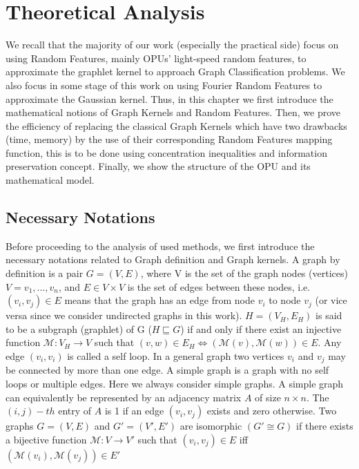 \addchapheadtotoc
\chapter{Theoretical Analysis}
We recall that the majority of our work (especially the practical side) focus on using Random Features, mainly OPUs' light-speed random features, to approximate the graphlet kernel to approach Graph Classification problems. We also focus in some stage of this work on using Fourier Random Features to approximate the Gaussian kernel. Thus, in this chapter we first introduce the mathematical notions of Graph Kernels and Random Features. Then, we prove the efficiency of replacing the classical Graph Kernels which have two drawbacks (time, memory) by the use of their corresponding Random Features mapping function, this is to be done using concentration inequalities and information preservation concept. Finally, we show the structure of the OPU and its mathematical model. 

\section{Necessary Notations}
Before proceeding to the analysis of used methods, we first introduce the necessary notations related to Graph definition and Graph kernels.
A graph by definition is a pair $G=(V,E)$, where V is the set of the graph nodes (vertices) $V={v_1,...,v_n}$, and $E\in V\times V$ is the set of edges between these nodes, i.e. $(v_i, v_j)\in E$ means that the graph has an edge from node $v_i$ to node $v_j$ (or vice versa since we consider undirected graphs in this work).
\newline $H=(V_H,E_H)$ is said to be a subgraph (graphlet) of G ($H\sqsubseteq G$) if and only if there exist an injective function $\mathcal{M}:V_H\xrightarrow{} V$ such that $(v,w)\in E_H \Leftrightarrow{(\mathcal{M}(v),\mathcal{M}(w))\in E}$.\newline
Any edge $(v_i, v_i)$ is called a self loop. In a general graph two vertices $v_i$ and $v_j$ may be connected by more than
one edge. A simple graph is a graph with no self loops
or multiple edges. Here we always consider simple graphs.\newline
A simple graph can equivalently be represented by an adjacency matrix $A$ of size $n \times n$. The $(i,j)-th$ entry of $A$ is 1 if an edge $(v_i, v_j)$ exists and zero otherwise.\newline
Two graphs $G=(V,E)$ and $G'=(V',E')$ are isomorphic $(G'\cong G)$ if there exists a bijective function $\mathcal{M}:V\xrightarrow{} V'$ such that $(v_i,v_j)\in E$ iff $(\mathcal{M}(v_i),\mathcal{M}(v_j))\in E'$


